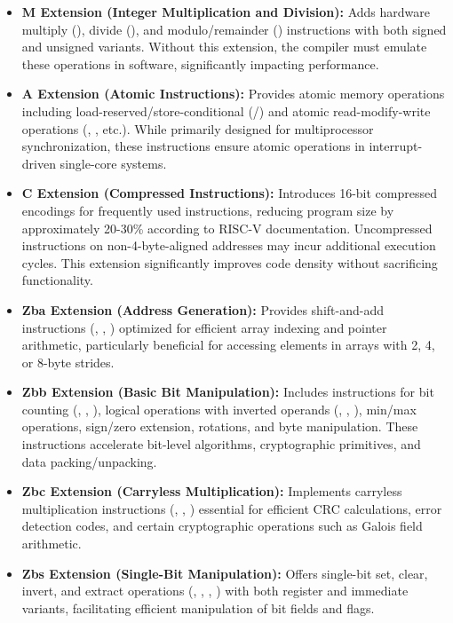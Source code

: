 \documentclass[11pt,pdftex,portrait,letterpaper]{article}
\begin{document}
\begin{itemize}
	\item \textbf{M Extension (Integer Multiplication and Division):} Adds hardware multiply (), divide (), and modulo/remainder () instructions with both signed and unsigned variants. Without this extension, the compiler must emulate these operations in software, significantly impacting performance.
	
	\item \textbf{A Extension (Atomic Instructions):} Provides atomic memory operations including load-reserved/store-conditional (/) and atomic read-modify-write operations (, , etc.). While primarily designed for multiprocessor synchronization, these instructions ensure atomic operations in interrupt-driven single-core systems.
	
	\item \textbf{C Extension (Compressed Instructions):} Introduces 16-bit compressed encodings for frequently used instructions, reducing program size by approximately 20-30\% according to RISC-V documentation. Uncompressed instructions on non-4-byte-aligned addresses may incur additional execution cycles. This extension significantly improves code density without sacrificing functionality.
	
	\item \textbf{Zba Extension (Address Generation):} Provides shift-and-add instructions (, , ) optimized for efficient array indexing and pointer arithmetic, particularly beneficial for accessing elements in arrays with 2, 4, or 8-byte strides.
	
	\item \textbf{Zbb Extension (Basic Bit Manipulation):} Includes instructions for bit counting (, , ), logical operations with inverted operands (, , ), min/max operations, sign/zero extension, rotations, and byte manipulation. These instructions accelerate bit-level algorithms, cryptographic primitives, and data packing/unpacking.
	
	\item \textbf{Zbc Extension (Carryless Multiplication):} Implements carryless multiplication instructions (, , ) essential for efficient CRC calculations, error detection codes, and certain cryptographic operations such as Galois field arithmetic.
	
	\item \textbf{Zbs Extension (Single-Bit Manipulation):} Offers single-bit set, clear, invert, and extract operations (, , , ) with both register and immediate variants, facilitating efficient manipulation of bit fields and flags.
\end{itemize}
\end{document}
